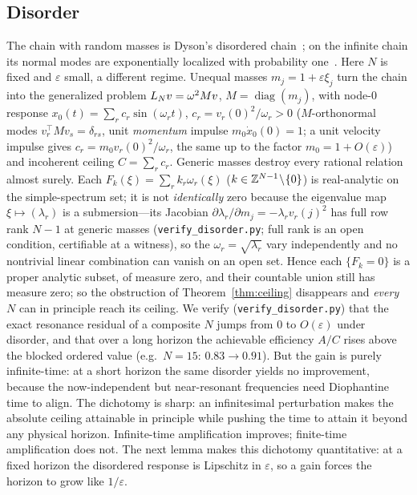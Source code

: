 \subsection{Disorder}
The chain with random masses is Dyson's disordered chain~\cite{Dyson53}; on the infinite chain its normal
modes are exponentially localized with probability one~\cite{MatsudaIshii70}. Here $N$ is fixed and
$\varepsilon$ small, a different regime.
Unequal masses $m_j=1+\varepsilon\xi_j$ turn the chain into the generalized problem $L_N v=\omega^2 Mv$,
$M=\operatorname{diag}(m_j)$, with node-$0$ response $x_0(t)=\sum_r c_r\sin(\omega_r t)$,
$c_r=v_r(0)^2/\omega_r>0$ ($M$-orthonormal modes $v_r^\top M v_s=\delta_{rs}$, unit \emph{momentum} impulse
$m_0\dot x_0(0)=1$; a unit velocity impulse gives $c_r=m_0v_r(0)^2/\omega_r$, the same up to the factor
$m_0=1+O(\varepsilon)$) and
incoherent ceiling $C=\sum_r c_r$. Generic masses destroy every rational relation almost surely. Each
$F_k(\xi)=\sum_r k_r\omega_r(\xi)$ ($k\in\mathbb{Z}^{N-1}\!\setminus\!\{0\}$) is real-analytic on the simple-spectrum
set; it is not \emph{identically} zero because the eigenvalue map $\xi\mapsto(\lambda_r)$ is a submersion---its
Jacobian $\partial\lambda_r/\partial m_j=-\lambda_r v_r(j)^2$ has full row rank $N-1$ at generic masses
(\texttt{verify\_disorder.py}; full rank is an open condition, certifiable at a witness), so the
$\omega_r=\sqrt{\lambda_r}$ vary independently and no nontrivial linear combination can vanish on an open set.
Hence each $\{F_k=0\}$ is a proper analytic subset, of measure zero, and their countable union still has
measure zero; so the obstruction of Theorem~\ref{thm:ceiling} disappears and \emph{every} $N$ can in principle
reach its ceiling. We verify (\texttt{verify\_disorder.py}) that the exact resonance
residual of a composite $N$ jumps from $0$ to $O(\varepsilon)$ under disorder, and that over a long
horizon the achievable efficiency $A/C$ rises above the blocked ordered value (e.g.\ $N=15$:
$0.83\!\to\!0.91$). But the gain is purely infinite-time: at a short horizon the same disorder yields no
improvement, because the now-independent but near-resonant frequencies need Diophantine time to align.
The dichotomy is sharp: an infinitesimal perturbation makes the absolute ceiling attainable in principle
while pushing the time to attain it beyond any physical horizon. Infinite-time amplification improves;
finite-time amplification does not. The next lemma makes this dichotomy quantitative: at a fixed horizon the
disordered response is Lipschitz in $\varepsilon$, so a gain forces the horizon to grow like $1/\varepsilon$.

